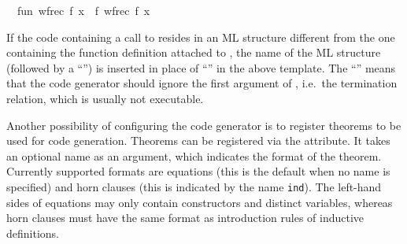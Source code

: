 \begin{isabellebody}
\ {}\ fun\ wfrec\ f\ x\ {}\ f\ {}wfrec\ f{}\ x\ {}%
\begin{isamarkuptext}%
If the code containing a call to  resides in an
  ML structure different from the one containing the function
  definition attached to , the name of the ML structure
  (followed by a ``'')  is inserted in place of ``'' in the above template.  The ``''  means that
  the code generator should ignore the first argument of , i.e.\ the termination relation, which is usually not
  executable.

  \medskip Another possibility of configuring the code generator is to
  register theorems to be used for code generation. Theorems can be
  registered via the \hyperlink{attribute.code}{\mbox{}} attribute. It takes an optional
  name as an argument, which indicates the format of the
  theorem. Currently supported formats are equations (this is the
  default when no name is specified) and horn clauses (this is
  indicated by the name \texttt{ind}). The left-hand sides of
  equations may only contain constructors and distinct variables,
  whereas horn clauses must have the same format as introduction rules
  of inductive definitions.


\end{isamarkuptext}
\end{isabellebody}
